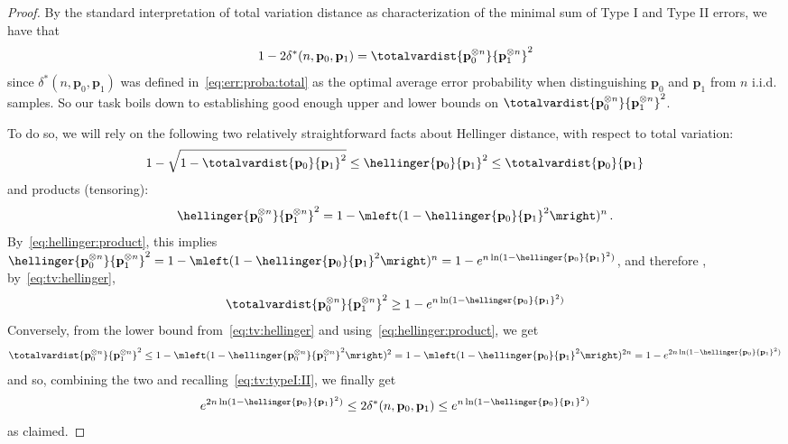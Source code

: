 \documentclass[10pt]{article}
\newcommand{\p}{\mathbf{p}}
\newcommand{\errproba}{\delta}
\newcommand{\ns}{n}
\begin{document}
\begin{proof}
By the standard interpretation of total variation distance as characterization of the minimal sum of Type I and Type II errors, we have that 
 \begin{equation}
  	\label{eq:tv:typeI:II}
	1-2\errproba^\ast(\ns,\p_0,\p_1) = \totalvardist{\p_0^{\otimes n}}{\p_1^{\otimes \ns}}^2
\end{equation}
since $\errproba^\ast(\ns,\p_0,\p_1)$ was defined in~\eqref{eq:err:proba:total} as the optimal average error probability when distinguishing $\p_0$ and $\p_1$ from $\ns$ i.i.d.\, samples. So our task boils down to establishing good enough upper and lower bounds on $\totalvardist{\p_0^{\otimes n}}{\p_1^{\otimes \ns}}^2$.

 
To do so, we will rely on the following two relatively straightforward facts about Hellinger distance, with respect to total variation:
  \begin{equation}
  	\label{eq:tv:hellinger}
    1-\sqrt{1-\totalvardist{\p_0}{\p_1}^2} \leq \hellinger{\p_0}{\p_1}^2 \leq \totalvardist{\p_0}{\p_1}
  \end{equation}
 and products (tensoring):
\begin{equation}
	\label{eq:hellinger:product}
\hellinger{\p_0^{\otimes \ns}}{\p_1^{\otimes \ns}}^2 = 1 - \mleft(1-\hellinger{\p_0}{\p_1}^2\mright)^{\ns}\,.
\end{equation}
By~\eqref{eq:hellinger:product}, this implies 
$
    \hellinger{\p_0^{\otimes n}}{\p_1^{\otimes \ns}}^2 = 1 - \mleft(1-\hellinger{\p_0}{\p_1}^2\mright)^\ns = 1-e^{\ns\ln(1-\hellinger{\p_0}{\p_1}^2)} 
$, 
and therefore , by~\eqref{eq:tv:hellinger},
\begin{equation}
\totalvardist{\p_0^{\otimes n}}{\p_1^{\otimes \ns}}^2 \geq 1-e^{\ns\ln(1-\hellinger{\p_0}{\p_1}^2)}
\end{equation}
\noindent Conversely, from the lower bound from~\eqref{eq:tv:hellinger} and using~\eqref{eq:hellinger:product}, we get
\begin{align}
	\totalvardist{\p_0^{\otimes n}}{\p_1^{\otimes \ns}}^2 
	\leq 1- \mleft( 1-\hellinger{\p_0^{\otimes \ns}}{\p_1^{\otimes \ns}}^2 \mright)^2
	= 1 - \mleft(1-\hellinger{\p_0}{\p_1}^2\mright)^{2\ns}
	= 1 - e^{2\ns\ln(1-\hellinger{\p_0}{\p_1}^2)}
\end{align}
and so, combining the two and recalling~\eqref{eq:tv:typeI:II}, we finally get
\begin{equation}
e^{2\ns\ln(1-\hellinger{\p_0}{\p_1}^2)} \leq 2\errproba^\ast(\ns,\p_0,\p_1) \leq e^{\ns\ln(1-\hellinger{\p_0}{\p_1}^2)}
\end{equation}
as claimed.
 \end{proof}
\end{document}
